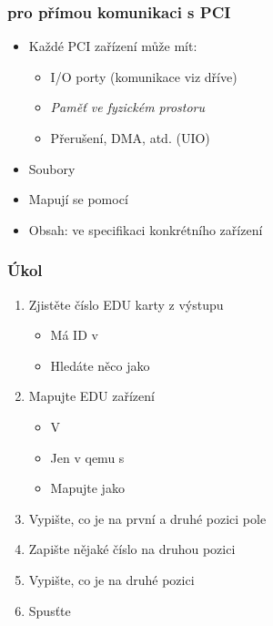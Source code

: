 \begin{frame}
  \frametitle{ pro přímou komunikaci s PCI}

  \begin{itemize}
    \item Každé PCI zařízení může mít:
    \begin{itemize}
      \item I/O porty (komunikace viz dříve)
      \item \emph{Paměť ve fyzickém prostoru}
      \item Přerušení, DMA, atd. (UIO)
    \end{itemize}

    \pause
    \medskip

    \item Soubory 
    \item Mapují se pomocí 
    \item Obsah: ve specifikaci konkrétního zařízení
  \end{itemize}

\end{frame}

\begin{frame}
  \frametitle{Úkol}

  \begin{enumerate}
    \item Zjistěte číslo EDU karty z výstupu 
    \begin{itemize}
      \item Má ID  v 
      \item Hledáte něco jako 
    \end{itemize}

    \item Mapujte  EDU zařízení
    \begin{itemize}
      \item V 
      \item Jen v qemu s 
      \item Mapujte jako 
    \end{itemize}

    \item Vypište, co je na první a druhé pozici pole 
    \item Zapište nějaké číslo na druhou pozici
    \item Vypište, co je na druhé pozici
    \item Spusťte
  \end{enumerate}

\end{frame}

